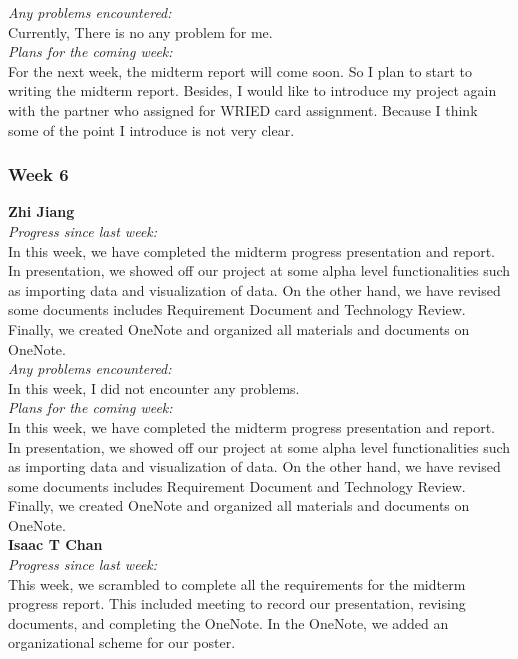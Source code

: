 \noindent\textit{Any problems encountered:}\\
Currently, There is no any problem for me.\\

\noindent\textit{Plans for the coming week:}\\
For the next week, the midterm report will come soon. So I plan to start to writing the midterm report. Besides, I would like to introduce my project again with the partner who assigned for WRIED card assignment. Because I think some of the point I introduce is not very clear.

\subsubsection{Week 6}
\textbf{Zhi Jiang}\\
\noindent\textit{Progress since last week:}\\
In this week, we have completed the midterm progress presentation and report. In presentation, we showed off our project at some alpha level functionalities such as importing data and visualization of data. On the other hand, we have revised some documents includes Requirement Document and Technology Review. Finally, we created OneNote and organized all materials and documents on OneNote.\\

\noindent\textit{Any problems encountered:}\\
In this week, I did not encounter any problems.\\

\noindent\textit{Plans for the coming week:}\\
In this week, we have completed the midterm progress presentation and report. In presentation, we showed off our project at some alpha level functionalities such as importing data and visualization of data. On the other hand, we have revised some documents includes Requirement Document and Technology Review. Finally, we created OneNote and organized all materials and documents on OneNote.\\

\noindent\textbf{Isaac T Chan}\\
\noindent\textit{Progress since last week:}\\
This week, we scrambled to complete all the requirements for the midterm progress report. This included meeting to record our presentation, revising documents, and completing the OneNote. In the OneNote, we added an organizational scheme for our poster.\\

